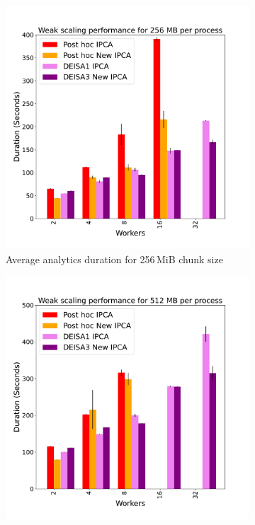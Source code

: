 \begin{figure}[h!]
\begin{subfigure}[b]{0.3\textwidth}
         \includegraphics[width=\textwidth, height=\textwidth]{figures/256A_1vs3vspost1vspost2.pdf}
         \caption{Average analytics duration for 256\,MiB chunk size}
         \label{fig:A256_1_3_p}
     \end{subfigure}
     \hfill
     \begin{subfigure}[b]{0.3\textwidth}
         \centering
         \includegraphics[width=\textwidth, height=\textwidth]{figures/512A_1vs3vspost1vspost2.pdf}

\end{subfigure}
\end{figure}
